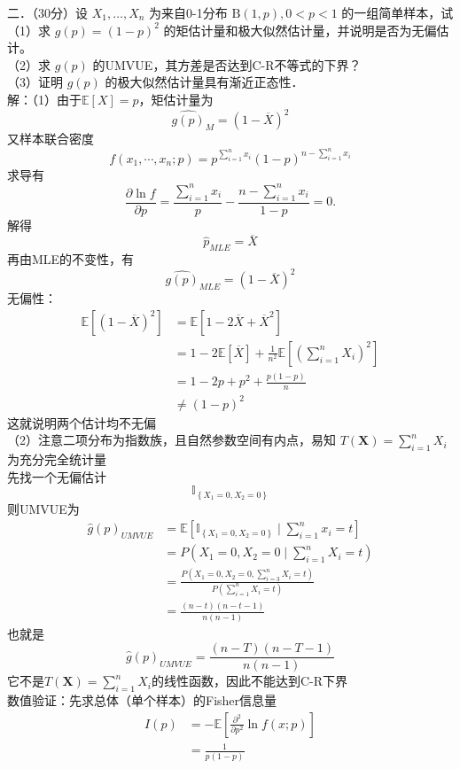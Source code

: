 \documentclass[UTF8,openany]{book}
\begin{document}
	
	\noindent 二．（30分）设 $X_1, \ldots, X_n$ 为来自0-1分布 $\mathrm{B}(1, p), 0<p<1$ 的一组简单样本，试\\
	（1）求 $g(p)=(1-p)^2$ 的矩估计量和极大似然估计量，并说明是否为无偏估计。\\
	（2）求 $g(p)$ 的UMVUE，其方差是否达到C-R不等式的下界？\\
	（3）证明 $g(p)$ 的极大似然估计量具有渐近正态性．\\
	解：（1）由于$\mathbb{E}[X]=p$，矩估计量为
	\[
	\hat{g({p})}_M=(1-\overline{X})^2
	\]
	又样本联合密度
	\[
	f\left(x_1, \cdots, x_n ; p\right)=p^{\sum_{i=1}^n x_i}(1-p)^{n-\sum_{i=1}^n x_i}
	\]
	求导有
	\[
	\frac{\partial \ln f}{\partial p}=\frac{\sum_{i=1}^{n} x_i}{p}-\frac{n-\sum_{i=1}^n x_i}{1-p}=0 .
	\]
	解得
	\[
	\hat{p}_{MLE}=\overline{X}
	\]
	再由MLE的不变性，有
	\[
	\hat{g(p)}_{MLE}=\left(1-\overline{X} \right)^2 
	\]
	无偏性：
	\[
	\begin{aligned}
		\mathbb{E}\left[(1-\overline{X})^2\right] & =\mathbb{E}\left[1-2 \overline{X}+\overline{X}^2\right] \\
		& =1-2 \mathbb{E}[\overline{X}]+\frac{1}{n^2} \mathbb{E}\left[\left(\sum_{i=1}^n X_i\right)^2 \right] \\
		& =1-2 p+p^2+\frac{p(1-p)}{n} \\
		& \neq(1-p)^2
	\end{aligned}
	\]
	这就说明两个估计均不无偏\\
	（2）注意二项分布为指数族，且自然参数空间有内点，易知 $T(\boldsymbol{X})=\sum\limits_{i=1}^n X_i$ 为充分完全统计量\\
	先找一个无偏估计
	\[
	\mathbb{I}_{\left\{X_1=0, X_2=0\right\}}
	\]
	则UMVUE为
	\[
	\begin{aligned}
		\hat{g}(p)_{UMVUE} &=\mathbb{E}\left[\mathbb{I}_{\left\{X_1=0, X_2=0\right\}} \mid \sum_{i=1}^n x_i=t\right] \\
		& =P\left(X_1=0, X_2=0 \mid \sum_{i=1}^n X_i=t \right) \\
		& =\frac{P\left(X_1=0, X_2=0, \sum_{i=3}^n X_i=t\right)}{P\left(\sum_{i=1}^n X_i=t\right)}\\
		&=\frac{(n-t)(n-t-1)}{n(n-1) }
	\end{aligned}
	\]
	也就是
	\[
	\hat{g}(p)_{UMVUE}=\frac{(n-T)(n-T-1)}{n(n-1) }
	\]
	它不是$T(\boldsymbol{X})=\sum\limits_{i=1}^n X_i$的线性函数，因此不能达到C-R下界\\
	数值验证：先求总体（单个样本）的Fisher信息量
	\[
	\begin{aligned}
		I\left(p\right) & =-\mathbb{E}\left[\frac{\partial^2}{\partial p^2} \ln f\left(x ; p\right)\right] \\
		& =\frac{1}{p(1-p)} 
	\end{aligned}
	\]
\end{document}
